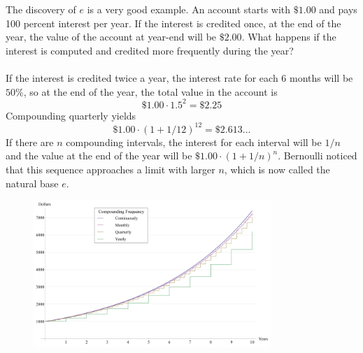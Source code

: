 \documentclass[a4paper]{article}
\begin{document}
The discovery of $\mathit{e}$ is a very good example. An account starts with $\$1.00$ and pays 100 percent interest per year. If the interest is credited once, at the end of the year, the value of the account at year-end will be $\$2.00$. What happens if the interest is computed and credited more frequently during the year?\\\\
If the interest is credited twice a year, the interest rate for each 6 months will be $50\%$, so at the end of the year, the total value in the account is
\begin{equation*}
	\$1.00 \cdot 1.5^2 = \$2.25
\end{equation*}
Compounding quarterly yields
\begin{equation*}
	\$1.00 \cdot (1 + 1/12)^{12} = \$2.613...
\end{equation*}
If there are $n$ compounding intervals, the interest for each interval will be $1/n$ and the value at the end of the year will be $\$1.00\cdot(1+1/n)^n$. Bernoulli noticed that this sequence approaches a limit with larger $n$, which is now called the natural base $\mathit{e}$.
\begin{figure}[H]
	\centering
	\includegraphics[width=0.8\textwidth]{euler1.png}
\end{figure}

\newpage


\end{document}
